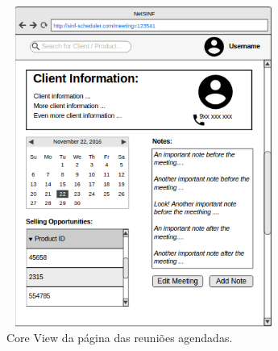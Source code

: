 \begin{titlepage}
\begin{figure}[H]
  \centering
    \includegraphics[width=9cm, height = 10.5cm]{SINF_meetingpage.png}
  \caption{Core View da página das reuniões agendadas.}
  \label{uml}
\end{figure}


\end{titlepage}
